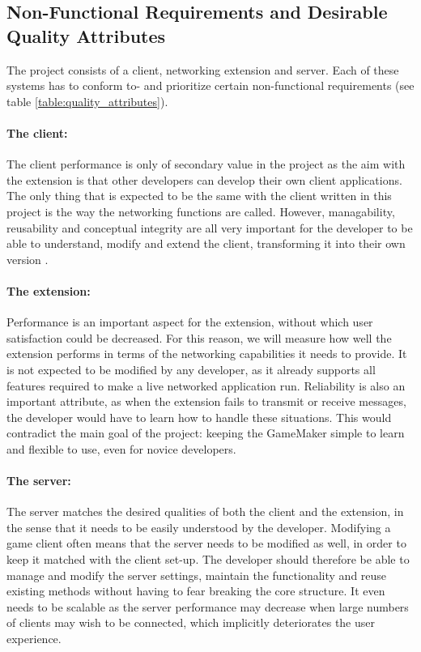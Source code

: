 \documentclass[bsc, 12pt, twoside, singlespacing, parskip, abbrevs, notimes, normalheadings, logo]{styles/infthesis}
\begin{document}
\subsection{Non-Functional Requirements and Desirable Quality Attributes}
The project consists of a client, networking extension and server. Each of these systems has to conform to- and prioritize certain non-functional requirements (see table \ref{table:quality_attributes}).

\paragraph*{The client:}
The client performance is only of secondary value in the project as the aim with the extension is that other developers can develop their own client applications. The only thing that is expected to be the same with the client written in this project is the way the networking functions are called. However, managability, reusability and conceptual integrity are all very important for the developer to be able to understand, modify and extend the client, transforming it into their own version \cite{Friendly_Programming}.

\paragraph*{The extension:}
Performance is an important aspect for the extension, without which user satisfaction could be decreased. For this reason, we will measure how well the extension performs in terms of the networking capabilities it needs to provide. It is not expected to be modified by any developer, as it already supports all features required to make a live networked application run. Reliability is also an important attribute, as when the extension fails to transmit or receive messages, the developer would have to learn how to handle these situations. This would contradict the main goal of the project: keeping the GameMaker simple to learn and flexible to use, even for novice developers.

\paragraph*{The server:}
The server matches the desired qualities of both the client and the extension, in the sense that it needs to be easily understood by the developer. Modifying a game client often means that the server needs to be modified as well, in order to keep it matched with the client set-up. The developer should therefore be able to manage and modify the server settings, maintain the functionality and reuse existing methods without having to fear breaking the core structure. It even needs to be scalable as the server performance may decrease when large numbers of clients may wish to be connected, which implicitly deteriorates the user experience.
\end{document}
